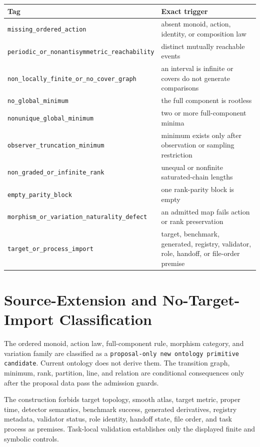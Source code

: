 \documentclass[11pt]{article}
\begin{document}
\begin{center}
\begin{tabular}{ll}
\toprule
Tag & Exact trigger \\
\midrule
\texttt{missing\_ordered\_action} & absent monoid, action, identity, or composition law \\
\texttt{periodic\_or\_nonantisymmetric\_reachability} & distinct mutually reachable events \\
\texttt{non\_locally\_finite\_or\_no\_cover\_graph} & an interval is infinite or covers do not generate comparisons \\
\texttt{no\_global\_minimum} & the full component is rootless \\
\texttt{nonunique\_global\_minimum} & two or more full-component minima \\
\texttt{observer\_truncation\_minimum} & minimum exists only after observation or sampling restriction \\
\texttt{non\_graded\_or\_infinite\_rank} & unequal or nonfinite saturated-chain lengths \\
\texttt{empty\_parity\_block} & one rank-parity block is empty \\
\texttt{morphism\_or\_variation\_naturality\_defect} & an admitted map fails action or rank preservation \\
\texttt{target\_or\_process\_import} & target, benchmark, generated, registry, validator, role, handoff, or file-order premise \\
\bottomrule
\end{tabular}
\end{center}

\section{Source-Extension and No-Target-Import Classification}

The ordered monoid, action law, full-component rule, morphism category, and
variation family are classified as a \texttt{proposal-only new ontology
primitive candidate}. Current ontology does not derive them. The transition
graph, minimum, rank, partition, line, and relation are conditional
consequences only after the proposal data pass the admission guards.

The construction forbids target topology, smooth atlas, target metric, proper
time, detector semantics, benchmark success, generated derivatives, registry
metadata, validator status, role identity, handoff state, file order, and task
process as premises. Task-local validation establishes only the displayed
finite and symbolic controls.
\end{document}
